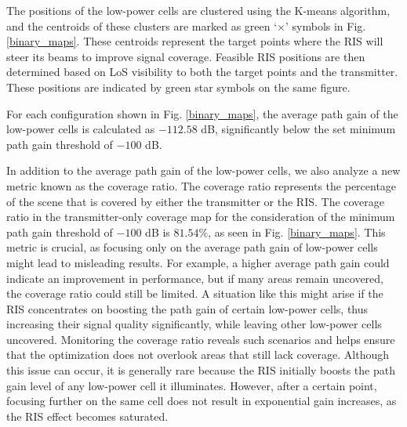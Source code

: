 \documentclass{IEEEoj}
\begin{document}
The positions of the low-power cells are clustered using the K-means algorithm, and the centroids of these clusters are marked as green `$\times$' symbols in Fig. \ref{binary_maps}. These centroids represent the target points where the RIS will steer its beams to improve signal coverage. Feasible RIS positions are then determined based on LoS visibility to both the target points and the transmitter. These positions are indicated by green star symbols on the same figure.

For each configuration shown in Fig. \ref{binary_maps}, the average path gain of the low-power cells is calculated as $-112.58$ dB, significantly below the set minimum path gain threshold of $-100$ dB.

In addition to the average path gain of the low-power cells, we also analyze a new metric known as the coverage ratio. The coverage ratio represents the percentage of the scene that is covered by either the transmitter or the RIS. The coverage ratio in the transmitter-only coverage map for the consideration of the minimum path gain threshold of $-100$ dB is $81.54\%$, as seen in Fig. \ref{binary_maps}. This metric is crucial, as focusing only on the average path gain of low-power cells might lead to misleading results. For example, a higher average path gain could indicate an improvement in performance, but if many areas remain uncovered, the coverage ratio could still be limited. A situation like this might arise if the RIS concentrates on boosting the path gain of certain low-power cells, thus increasing their signal quality significantly, while leaving other low-power cells uncovered. Monitoring the coverage ratio reveals such scenarios and helps ensure that the optimization does not overlook areas that still lack coverage. Although this issue can occur, it is generally rare because the RIS initially boosts the path gain level of any low-power cell it illuminates. However, after a certain point, focusing further on the same cell does not result in exponential gain increases, as the RIS effect becomes saturated.
\end{document}
